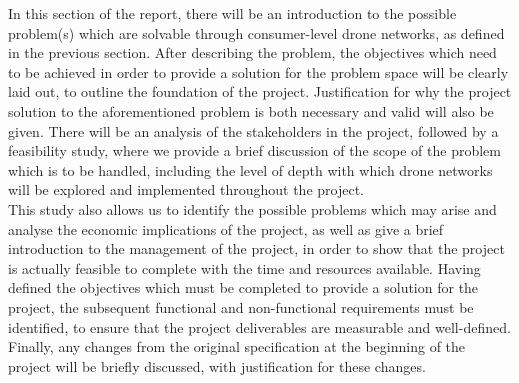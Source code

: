 In this section of the report, there will be an introduction to the possible problem(s) which are solvable through consumer-level drone networks, as defined in the previous section. After describing the problem, the objectives which need to be achieved in order to provide a solution for the problem space will be clearly laid out, to outline the foundation of the project. Justification for why the project solution to the aforementioned problem is both necessary and valid will also be given. There will be an analysis of the stakeholders in the project, followed by a feasibility study, where we provide a brief discussion of the scope of the problem which is to be handled, including the level of depth with which drone networks will be explored and implemented throughout the project. \\
This study also allows us to identify the possible problems which may arise and analyse the economic implications of the project, as well as give a brief introduction to the management of the project, in order to show that the project is actually feasible to complete with the time and resources available. Having defined the objectives which must be completed to provide a solution for the project, the subsequent functional and non-functional requirements must be identified, to ensure that the project deliverables are measurable and well-defined. Finally, any changes from the original specification at the beginning of the project will be briefly discussed, with justification for these changes.
